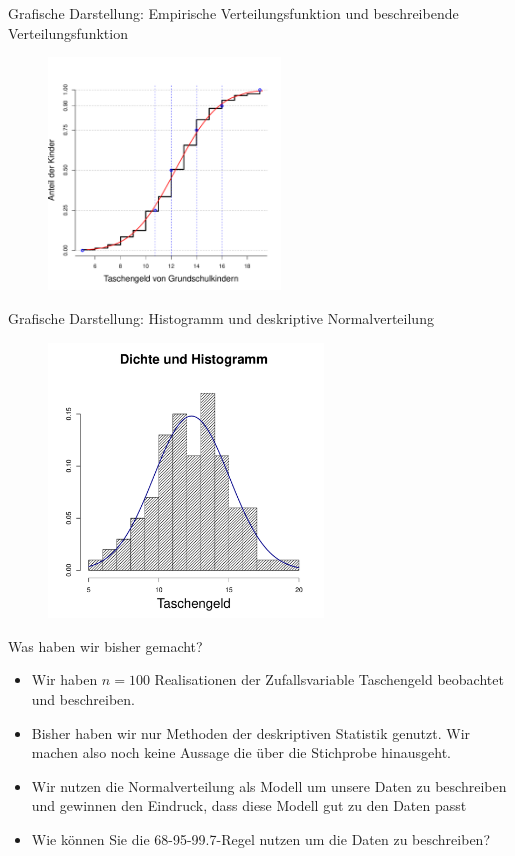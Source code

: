 \documentclass[usenames,dvipsnames,handout]{beamer}
\begin{document}
\begin{frame}{Grafische Darstellung: Empirische Verteilungsfunktion und beschreibende Verteilungsfunktion}
        \begin{figure}[ht]
 	\centering
 	      \includegraphics[width=0.55\textwidth]{taschengeld_theo.pdf}
 	\end{figure}
\end{frame}

\begin{frame}{Grafische Darstellung: Histogramm und deskriptive Normalverteilung}
        \begin{figure}[ht]
 	\centering
 	      \includegraphics[width=0.65\textwidth]{taschengeld_dens.pdf}
 	\end{figure}
\end{frame}


\begin{frame}{Was haben wir bisher gemacht?}
\begin{itemize}
\item{Wir haben $n=100$ Realisationen der Zufallsvariable Taschengeld beobachtet
und beschreiben.}\pause
\item{Bisher haben wir nur Methoden der deskriptiven Statistik genutzt. Wir machen also
noch keine Aussage die über die Stichprobe hinausgeht.}\pause
\item{Wir nutzen die Normalverteilung als Modell um unsere Daten zu beschreiben
und gewinnen den Eindruck, dass diese Modell gut zu den Daten passt}\pause
\item{Wie können Sie die 68-95-99.7-Regel nutzen um die Daten zu beschreiben?}
\end{itemize}
\end{frame}
\end{document}

